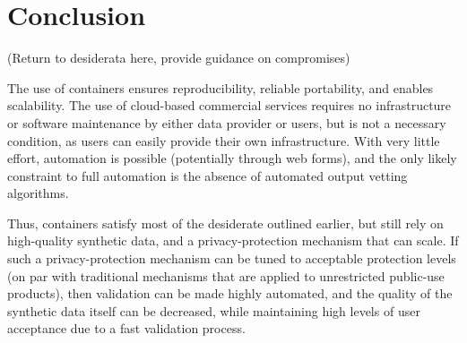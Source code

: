 \documentclass[]{hdsr}
\begin{document}
\section{Conclusion}

(Return to desiderata here, provide guidance on compromises)

The use of containers ensures reproducibility, reliable portability, and enables scalability. The use of cloud-based commercial services requires no infrastructure or software maintenance by either data provider or users, but is not a necessary condition, as users can easily provide their own infrastructure. With very little effort, automation is possible (potentially through web forms), and the only likely constraint to full automation is the absence of automated output vetting algorithms. 

Thus, containers satisfy most of the desiderate outlined earlier, but still rely on high-quality synthetic data, and a privacy-protection mechanism that can scale. If such a privacy-protection mechanism can be tuned to acceptable protection levels (on par with traditional mechanisms that are applied to unrestricted public-use products), then validation can be made highly automated, and the quality of the synthetic data itself can be decreased, while maintaining high levels of user acceptance due to a fast validation process.

\end{document}
